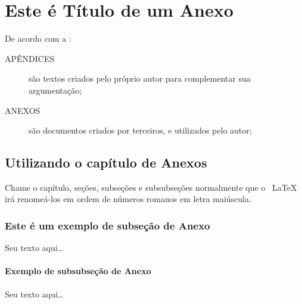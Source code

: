 
\chapter{Este é Título de um Anexo} 

De acordo com a :
\begin{description}
    \item [APÊNDICES] são textos criados pelo próprio autor para complementar sua argumentação;
    \item [ANEXOS] são documentos criados por terceiros, e utilizados pelo autor;
\end{description}

\section{Utilizando o capítulo de Anexos}

Chame o capítulo, seções, subseções e subsubseções normalmente que o ~\LaTeX~ irá renomeá-los em ordem de números romanos em letra maiúscula.

\subsection{Este é um exemplo de subseção de Anexo}

Seu texto aqui\ldots

\subsubsection{Exemplo de subsubseção de Anexo}

Seu texto aqui\ldots